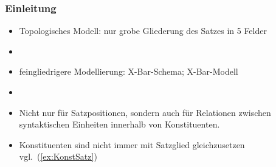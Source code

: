 \begin{frame}
\frametitle{Einleitung}

\begin{itemize}
	\item Topologisches Modell: nur grobe Gliederung des Satzes in 5 Felder
	\item[]	
	\item feingliedrigere Modellierung: X-Bar-Schema; X-Bar-Modell
	\item[]
	\item Nicht nur für Satzpositionen, sondern auch für Relationen zwischen syntaktischen Einheiten innerhalb von Konstituenten.


\eal 
{}
 \label{ex:KonstSatz}
\zl

	\item Konstituenten sind nicht immer mit Satzglied gleichzusetzen vgl.\ (\ref{ex:KonstSatz})
	
\end{itemize}

\end{frame}


